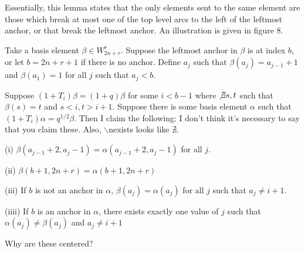 \documentclass{amsart}
\begin{document}
Essentially, this lemma states that the only elements sent to the same element are those which break at most one of the top level arcs to the left of the leftmost anchor, or that break the leftmost anchor. An illustration is given in figure 8.

\vspace{5mm}
\begin{lemma}
	Take a basis element $\beta\in W_{2n+r}^r$. Suppose the leftmost anchor in $\beta$ is at index $b$, or let $b=2n+r+1$ if there is no anchor. Define $a_j$ such that $\beta(a_j)=a_{j-1}+1$ and $\beta(a_1)=1$ for all $j$ such that $a_j<b$. 
	
	Suppose $(1+T_i)\beta=(1+q)\beta$ for some $i<b-1$ where $\not\exists s,t$ such that $\beta(s)=t$ and $s<i,t>i+1$. Suppose there is some basis element $\alpha$ such that $(1+T_i)\alpha=q^{1/2}\beta$. Then I claim the following:
  {\color{magenta} I don't think it's necessary to say that you claim these. Also, $\backslash$nexists looks like $\nexists$.}	
	\vspace{5mm}
	\begin{center}
		(i) $\beta(a_{j-1}+2,a_j-1)=\alpha(a_{j-1}+2,a_j-1)$ for all $j$.
		
		\vspace{5mm}
		(ii) $\beta(b+1,2n+r)=\alpha(b+1,2n+r)$
		
		\vspace{5mm}
		(iii)
		If $b$ is not an anchor in $\alpha$, $\beta(a_j)=\alpha(a_j)$ for all $j$ such that $a_j\not=i+1$.
		
		\vspace{5mm}
		(iiii) If $b$ is an anchor in $\alpha$, there exists exactly one value of $j$ such that $\alpha(a_j)\not=\beta(a_j)$ and $a_j\not=i+1$
	\end{center}
\end{lemma}
  {\color{magenta} Why are these centered?}
\end{document}
